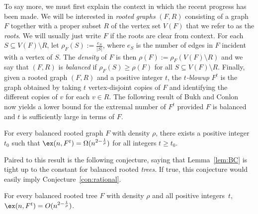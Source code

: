 To say more, we must first explain the context in which the recent progress has been made. We will be interested in {\it rooted graphs} $(F, R)$ consisting of a graph $F$ together with a proper subset $R$ of the vertex set $V(F)$ that we refer to as the {\it roots}. We will usually just write $F$ if the roots are clear from context. For each $S \subseteq V(F) \setminus R$, let $\rho_F(S) := \frac{e_S}{|S|}$, where $e_S$ is the number of edges in $F$ incident with a vertex of $S$. 
The \emph{density} of $F$ is then $\rho(F) := \rho_F(V(F) \setminus R)$ and we say that $(F, R)$ is {\it balanced} if $\rho_F(S) \geq \rho(F)$ for all $S \subseteq V(F) \setminus R$. Finally, given a rooted graph $(F, R)$ and a positive integer $t$, the {\it $t$-blowup} $F^t$ is the graph obtained by taking $t$ vertex-disjoint copies of $F$ and identifying the different copies of $v$ for each $v \in R$. The following result of Bukh and Conlon~\cite{BC18} now yields a lower bound for the extremal number of $F^t$ provided $F$ is balanced and $t$ is sufficiently large in terms of $F$.

\begin{lemma} \label{lem:BC}
For every balanced rooted graph $F$ with density $\rho$, there exists a positive integer $t_0$ such that $\ex(n, F^t)=\Omega(n^{2-\frac{1}{\rho}})$ for all integers $t \geq t_0$.
\end{lemma}

Paired to this result is the following conjecture, saying that Lemma~\ref{lem:BC} is tight up to the constant for balanced rooted {\it trees}. If true, this conjecture would easily imply Conjecture~\ref{con:rational}. 

\begin{conjecture} \label{con:BC}
For every balanced rooted tree $F$ with density $\rho$ and all positive integers~$t$, $\ex(n, F^t) = O(n^{2-\frac{1}{\rho}})$.
\end{conjecture}

